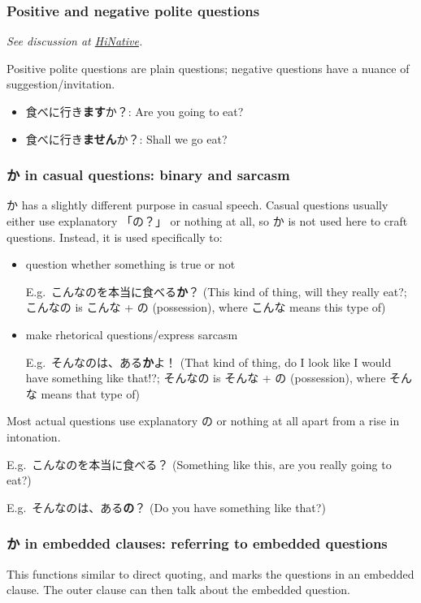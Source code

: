 \documentclass[../nihongo-gakushuu-kyouzai.tex]{subfiles}
\begin{document}
\subsubsection{Positive and negative polite questions} \label{sec:positive-negative-questions}
\emph{See discussion at \href{https://ja.hinative.com/questions/16031339}{HiNative}.}

Positive polite questions are plain questions; negative questions have a nuance of suggestion/invitation.
\begin{itemize}
    \item 食べに行き\textbf{ます}か？: Are you going to eat?
    \item 食べに行き\textbf{ません}か？: Shall we go eat?
\end{itemize}

\subsubsection{か in casual questions: binary and sarcasm}
か has a slightly different purpose in casual speech. Casual questions usually either use explanatory 「の？」 or nothing at all, so か is not used here to craft questions. Instead, it is used specifically to:
\begin{itemize}
    \item question whether something is true or not

    E.g.\ こんなのを本当に食べる\textbf{か}？ (This kind of thing, will they really eat?; こんなの is こんな + の (possession), where こんな means this type of)

    \item make rhetorical questions/express sarcasm

    E.g.\ そんなのは、ある\textbf{か}よ！ (That kind of thing, do  I look like I would have something like that!?; そんなの is そんな + の (possession), where そんな means that type of)
\end{itemize}
Most actual questions use explanatory の or nothing at all apart from a rise in intonation.

E.g.\ こんなのを本当に食べる？ (Something like this, are you really going to eat?)

E.g.\ そんなのは、ある\textbf{の}？ (Do you have something like that?)

\subsubsection{か in embedded clauses: referring to embedded questions}
This functions similar to direct quoting, and marks the questions in an embedded clause. The outer clause can then talk about the embedded question.
\end{document}
